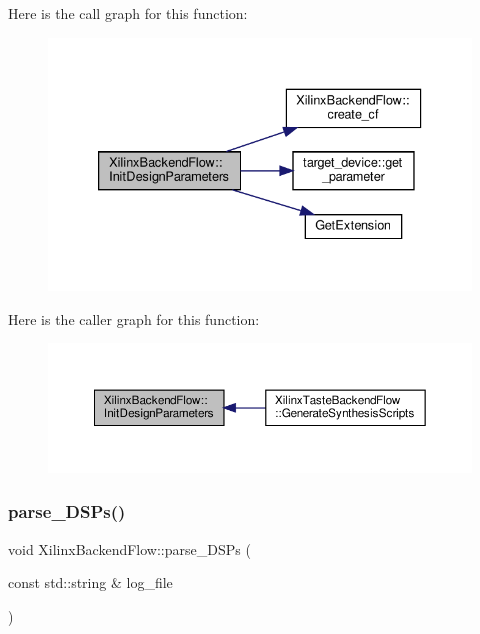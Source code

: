 Here is the call graph for this function\+:
\nopagebreak
\begin{figure}[H]
\begin{center}
\leavevmode
\includegraphics[width=333pt]{d6/d94/classXilinxBackendFlow_a60d2b3155b8efbcba6ccf49d543751ea_cgraph}
\end{center}
\end{figure}
Here is the caller graph for this function\+:
\nopagebreak
\begin{figure}[H]
\begin{center}
\leavevmode
\includegraphics[width=350pt]{d6/d94/classXilinxBackendFlow_a60d2b3155b8efbcba6ccf49d543751ea_icgraph}
\end{center}
\end{figure}
\mbox{\label{classXilinxBackendFlow_aad2aac0a9f9a4158831cfd4f842a8b24}} 
\subsubsection{\texorpdfstring{parse\+\_\+\+D\+S\+Ps()}{parse\_DSPs()}}
{\footnotesize\ttfamily void Xilinx\+Backend\+Flow\+::parse\+\_\+\+D\+S\+Ps (\begin{DoxyParamCaption}\item[{const std\+::string \&}]{log\+\_\+file }\end{DoxyParamCaption})\hspace{0.3cm}{\ttfamily [protected]}}



